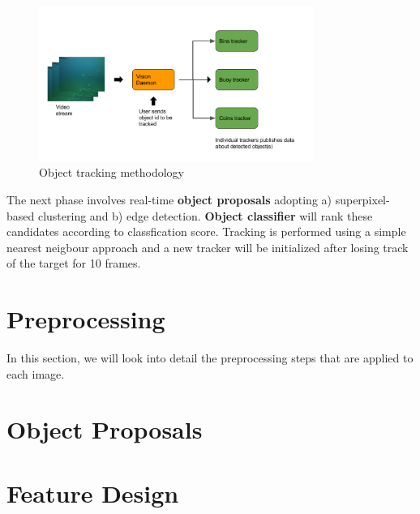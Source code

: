 \documentclass[fypca]{socreport}
\begin{document}
\begin{figure}[H]
\centering
  \includegraphics[width=0.8\textwidth, height=0.3\textheight]{tracking_method.png}
  \caption{Object tracking methodology}
  \label{fig:tracking_methodology}
\end{figure}

The next phase involves real-time \textbf{object proposals} adopting a)
superpixel-based clustering and b) edge detection. \textbf{Object classifier}
will rank these candidates according to classfication score. Tracking is
performed using a simple nearest neigbour approach and a new tracker will be
initialized after losing track of the target for 10 frames.


\chapter{Preprocessing}

In this section, we will look into detail the preprocessing steps that are
applied to each image. 


\chapter{Object Proposals}


\chapter{Feature Design}
\end{document}
